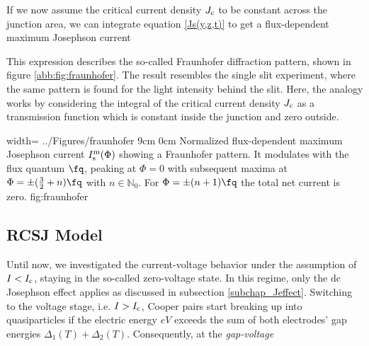 If we now assume the critical current density $J_{\rm c}$ to be constant across the junction area, we can integrate equation \ref{Js(y,z,t)} to get a flux-dependent maximum Josephson current


This expression describes the so-called Fraunhofer diffraction pattern, shown in figure \ref{abb:fig:fraunhofer}. The result resembles the single slit experiment, where the same pattern is found for the light intensity behind the slit. Here, the analogy works by considering the integral of the critical current density $J_{\rm c}$ as a transmission function which is constant inside the junction and zero outside. 

{width=\textwidth}
{../Figures/fraunhofer}
{9cm}
{0cm}
{Normalized flux-dependent maximum Josephson current $I_{\rm s}^{\rm m}(\Phi)$ showing a Fraunhofer pattern. It modulates with the flux quantum $\unit{\fq}$, peaking at $\Phi=0$ with subsequent maxima at $\Phi=\pm(\frac{3}{2}+n)\unit{\fq}$ with $n\in\mathbb{N}_0$. For $\Phi=\pm(n+1)\unit{\fq}$ the total net current is zero.} 
{fig:fraunhofer}


\subsection{RCSJ Model}\label{subsec_RCSJ}

Until now, we investigated the current-voltage behavior under the assumption of $I<I_{\rm c}$, staying in the so-called zero-voltage state. In this regime, only the dc Josephson effect applies as discussed in subsection \ref{subchap_Jeffect}. Switching to the voltage stage, i.e. $I>I_{\rm c}$, Cooper pairs start breaking up into quasiparticles if the electric energy $eV$ exceeds the sum of both electrodes' gap energies $\Delta_1(T) + \Delta_2(T)$. Consequently, at the \textit{gap-voltage} 



